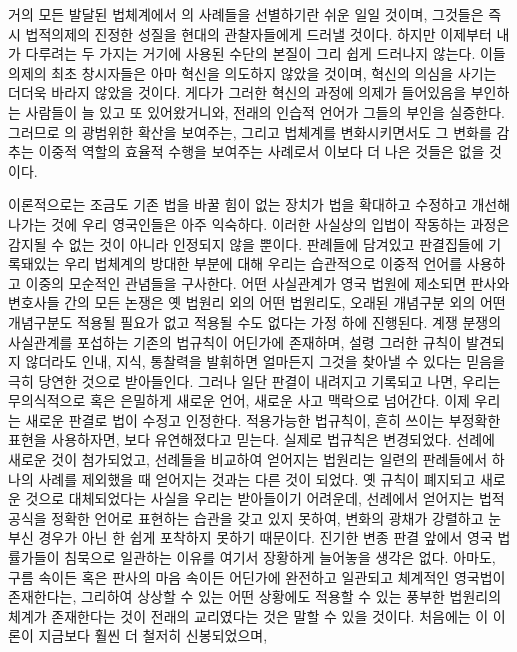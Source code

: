 거의 모든 발달된 법체계에서 의 사례들을 선별하기란
쉬운 일일 것이며, 그것들은 즉시 법적의제의 진정한 성질을 현대의 관찰자들에게
드러낼 것이다.
하지만 이제부터 내가 다루려는 두 가지는
거기에 사용된 수단의 본질이 그리 쉽게 드러나지 않는다.
이들 의제의 최초 창시자들은 아마 혁신을 의도하지 않았을 것이며,
혁신의 의심을 사기는 더더욱 바라지 않았을 것이다.
게다가 그러한 혁신의 과정에 의제가 들어있음을 부인하는
사람들이 늘 있고 또 있어왔거니와,
전래의 인습적 언어가 그들의 부인을 실증한다.
그러므로 의 광범위한 확산을 보여주는,
그리고 법체계를 변화시키면서도 그 변화를 감추는 이중적 역할의
효율적 수행을 보여주는 사례로서 이보다 더 나은 것들은 없을 것이다.

이론적으로는 조금도 기존 법을 바꿀 힘이 없는 장치가
법을 확대하고 수정하고 개선해나가는 것에
우리 영국인들은 아주 익숙하다.
이러한 사실상의 입법이 작동하는 과정은 감지될 수 없는 것이 아니라
인정되지 않을 뿐이다.
판례들에 담겨있고 판결집들에 기록돼있는 우리 법체계의 방대한 부분에 대해
우리는 습관적으로 이중적 언어를 사용하고 이중의 모순적인 관념들을 구사한다.
어떤 사실관계가 영국 법원에 제소되면
판사와 변호사들 간의 모든 논쟁은
옛 법원리 외의 어떤 법원리도,
오래된 개념구분 외의 어떤 개념구분도
적용될 필요가 없고 적용될 수도 없다는
가정 하에 진행된다.
계쟁 분쟁의 사실관계를 포섭하는 기존의 법규칙이 어딘가에 존재하며,
설령 그러한 규칙이 발견되지 않더라도 인내, 지식, 통찰력을 발휘하면
얼마든지 그것을 찾아낼 수 있다는 믿음을 극히 당연한 것으로 받아들인다.
그러나 일단 판결이 내려지고 기록되고 나면, 우리는 무의식적으로 혹은 은밀하게
새로운 언어, 새로운 사고 맥락으로 넘어간다.
이제 우리는 새로운 판결로 법이 수정고 인정한다.
적용가능한 법규칙이, 흔히 쓰이는 부정확한 표현을 사용하자면,
보다 유연해졌다고 믿는다.
실제로 법규칙은 변경되었다.
선례에 새로운 것이 첨가되었고, 선례들을 비교하여 얻어지는 법원리는
일련의 판례들에서 하나의 사례를 제외했을 때 얻어지는 것과는 다른 것이 되었다.
옛 규칙이 폐지되고 새로운 것으로 대체되었다는 사실을 우리는 받아들이기 어려운데,
선례에서 얻어지는 법적 공식을 정확한 언어로 표현하는 습관을 갖고 있지 못하여,
변화의 광채가 강렬하고 눈부신 경우가 아닌 한 쉽게 포착하지 못하기 때문이다.
진기한 변종 판결 앞에서 영국 법률가들이 침묵으로 일관하는
이유를 여기서 장황하게 늘어놓을 생각은 없다.
아마도, 구름 속이든 혹은
판사의 마음 속이든 어딘가에
완전하고 일관되고 체계적인 영국법이 존재한다는, 그리하여 상상할 수 있는 어떤 상황에도
적용할 수 있는 풍부한 법원리의 체계가 존재한다는 것이 전래의 교리였다는 것은
말할 수 있을 것이다.
처음에는 이 이론이 지금보다 훨씬 더 철저히 신봉되었으며,
